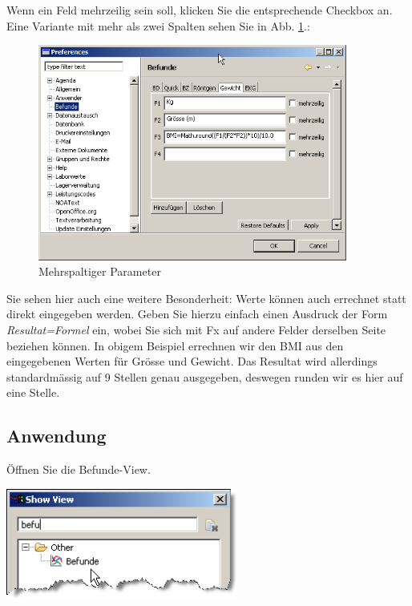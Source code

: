 Wenn ein Feld mehrzeilig sein soll, klicken Sie die entsprechende Checkbox an. Eine Variante mit mehr als zwei Spalten sehen Sie in Abb. \ref{fig:befunde4}.:
\begin{figure}[htp]
    \includegraphics[width=4in]{images/befunde7.png}
    \caption{Mehrspaltiger Parameter}\label{fig:befunde4}
\end{figure}

Sie sehen hier auch eine weitere Besonderheit: Werte können auch errechnet statt direkt eingegeben werden. Geben Sie hierzu einfach einen Ausdruck der Form \textit{Resultat=Formel} ein, wobei Sie sich mit Fx auf andere Felder derselben Seite beziehen können. In obigem Beispiel errechnen wir den BMI aus den eingegebenen Werten für Grösse und Gewicht. Das Resultat wird allerdings standardmässig auf 9 Stellen genau ausgegeben, deswegen runden wir es hier auf eine Stelle.

\subsection{Anwendung}

Öffnen Sie die  Befunde-View.
\begin{flushleft}
\includegraphics[width=3in]{images/befunde4.png}
\end{flushleft}

